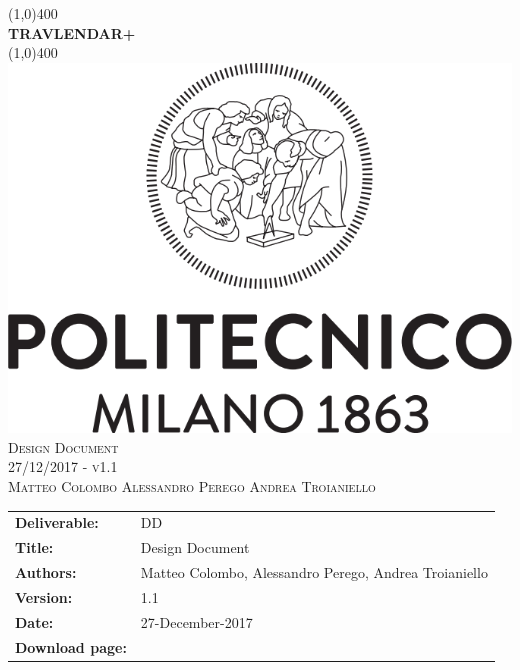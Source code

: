 
\usepackage{float}
\usepackage[section]{placeins}


\begin{titlepage}
	\begin{center}
		\line(1,0){400}\\	[0.6cm]
		\Huge{\bfseries{TRAVLENDAR+}}\\
		\line(1,0){400}\\
		[3cm]
		\includegraphics[scale=0.3]{Images/polimi}\\
		[3cm]
		\textsc{\Huge Design Document}\\[1cm]
		\textsc{\huge 27/12/2017 - v1.1}\\
		[4cm]
		\textsc{\normalsize Matteo Colombo \hspace{0.4cm} Alessandro Perego \hspace{0.4cm} Andrea Troianiello }
	\end{center}
\end{titlepage}
	
\begin{table}[h!]
\begin{tabu} to \textwidth { X[0.3,r,p] X[0.7,l,p] }
\hline

\textbf{Deliverable:} & DD\\
\textbf{Title:} & Design Document \\
\textbf{Authors:} & Matteo Colombo, Alessandro Perego, Andrea Troianiello \\
\textbf{Version:} & 1.1 \\ 
\textbf{Date:} & 27-December-2017 \\
\textbf{Download page:} & \href{https://github.com/MatteoColombo/ColomboPeregoTroianiello}{\color{Black}{GitHub - ColomboPeregoTroianiello repository}} \\
\hline
\end{tabu}
\end{table}

